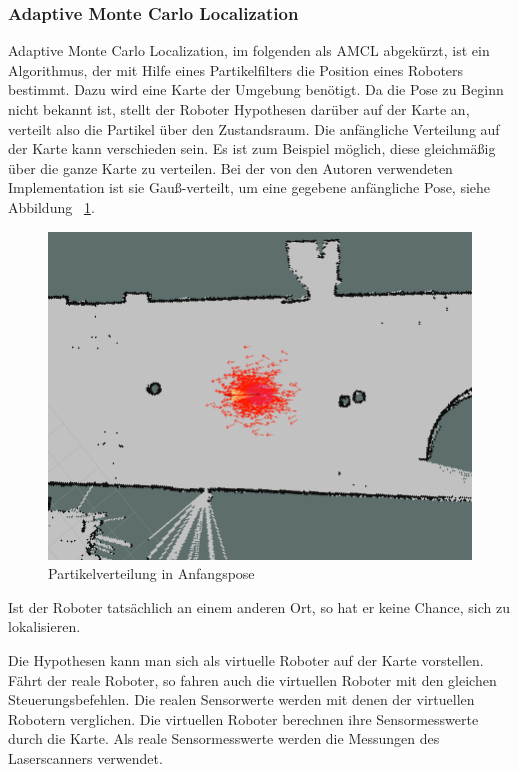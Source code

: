 \documentclass[11pt,a4paper]{article}
\begin{document}
\subsubsection{Adaptive Monte Carlo Localization \cite{mclWiki} \cite{amclPaper}} 
{
	Adaptive Monte Carlo Localization, im folgenden als AMCL abgek\"urzt, ist ein Algorithmus, der mit Hilfe eines Partikelfilters die Position eines Roboters bestimmt. Dazu wird eine Karte der Umgebung ben\"otigt. Da die Pose zu Beginn nicht bekannt ist, stellt der Roboter Hypothesen dar\"uber auf der Karte an, verteilt also die Partikel \"uber den Zustandsraum. Die anf\"angliche Verteilung auf der Karte kann verschieden sein. Es ist zum Beispiel m\"oglich, diese  gleichm\"a{\ss}ig \"uber die ganze Karte zu verteilen. 
	Bei der von den Autoren verwendeten Implementation ist sie Gau{\ss}-verteilt, um eine gegebene anf\"angliche Pose, siehe Abbildung ~\ref{fig:initalParticleDistribution}. \begin{figure}[h]
		\includegraphics[width=\linewidth]{pictures/initial_distribution.jpg}
		\caption{Partikelverteilung in Anfangspose \label{fig:initalParticleDistribution}}
	\end{figure}
	\newpage
	Ist der Roboter tats\"achlich an einem anderen Ort, so hat er keine Chance, sich zu lokalisieren. 
	
	Die Hypothesen kann man sich als virtuelle Roboter auf der Karte vorstellen. F\"ahrt der reale Roboter, so fahren auch die virtuellen Roboter mit den gleichen Steuerungsbefehlen. Die realen Sensorwerte werden mit denen der virtuellen Robotern verglichen. Die virtuellen Roboter berechnen ihre Sensormesswerte durch die Karte. Als reale Sensormesswerte werden die Messungen des Laserscanners verwendet. 
	
}
\end{document}
